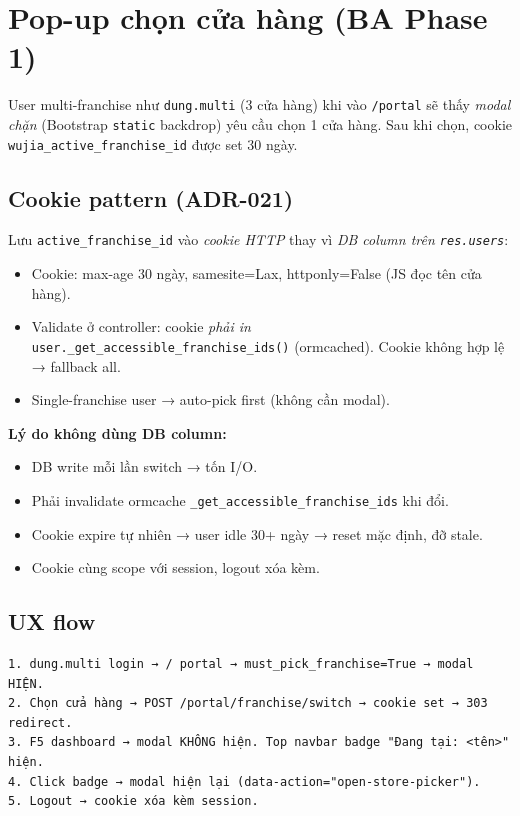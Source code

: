 \section{Pop-up chọn cửa hàng (BA Phase 1)}

User multi-franchise như \texttt{dung.multi} (3 cửa hàng) khi vào \texttt{/portal} sẽ thấy \emph{modal chặn} (Bootstrap \texttt{static} backdrop) yêu cầu chọn 1 cửa hàng. Sau khi chọn, cookie \texttt{wujia\_active\_franchise\_id} được set 30 ngày.

\subsection{Cookie pattern (ADR-021)}

Lưu \texttt{active\_franchise\_id} vào \emph{cookie HTTP} thay vì \emph{DB column trên \texttt{res.users}}:

\begin{itemize}
    \item Cookie: max-age 30 ngày, samesite=Lax, httponly=False (JS đọc tên cửa hàng).
    \item Validate ở controller: cookie \emph{phải in} \texttt{user.\_get\_accessible\_franchise\_ids()} (ormcached). Cookie không hợp lệ → fallback all.
    \item Single-franchise user → auto-pick first (không cần modal).
\end{itemize}

\textbf{Lý do không dùng DB column:}
\begin{itemize}
    \item DB write mỗi lần switch → tốn I/O.
    \item Phải invalidate ormcache \texttt{\_get\_accessible\_franchise\_ids} khi đổi.
    \item Cookie expire tự nhiên → user idle 30+ ngày → reset mặc định, đỡ stale.
    \item Cookie cùng scope với session, logout xóa kèm.
\end{itemize}

\subsection{UX flow}

\begin{lstlisting}[style=shell]
1. dung.multi login → / portal → must_pick_franchise=True → modal HIỆN.
2. Chọn cửa hàng → POST /portal/franchise/switch → cookie set → 303 redirect.
3. F5 dashboard → modal KHÔNG hiện. Top navbar badge "Đang tại: <tên>" hiện.
4. Click badge → modal hiện lại (data-action="open-store-picker").
5. Logout → cookie xóa kèm session.
\end{lstlisting}

